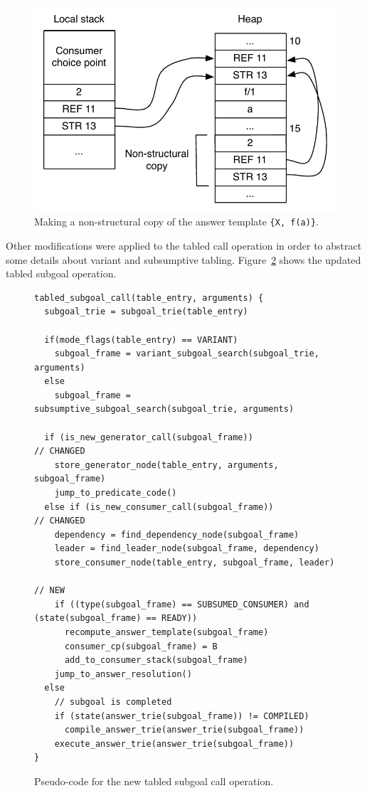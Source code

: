 \begin{figure}[ht]
  \centering
    \includegraphics[scale=0.6]{non_structural_copy.pdf}
  \caption{Making a non-structural copy of the answer template \texttt{\{X,~f(a)\}}.}
  \label{fig:non_structural_copy}
\end{figure}

Other modifications were applied to the tabled call operation in order to abstract some details about
variant and subsumptive tabling. Figure~\ref{fig:tabled_subgoal_call_new} shows the updated tabled
subgoal operation.

\begin{figure}[ht]
\begin{Verbatim}
tabled_subgoal_call(table_entry, arguments) {
  subgoal_trie = subgoal_trie(table_entry)
  
  if(mode_flags(table_entry) == VARIANT)
    subgoal_frame = variant_subgoal_search(subgoal_trie, arguments)
  else
    subgoal_frame = subsumptive_subgoal_search(subgoal_trie, arguments)
  
  if (is_new_generator_call(subgoal_frame))                 // CHANGED
    store_generator_node(table_entry, arguments, subgoal_frame)
    jump_to_predicate_code()
  else if (is_new_consumer_call(subgoal_frame))             // CHANGED
    dependency = find_dependency_node(subgoal_frame)
    leader = find_leader_node(subgoal_frame, dependency)
    store_consumer_node(table_entry, subgoal_frame, leader)
                                                            // NEW
    if ((type(subgoal_frame) == SUBSUMED_CONSUMER) and (state(subgoal_frame) == READY))
      recompute_answer_template(subgoal_frame)
      consumer_cp(subgoal_frame) = B
      add_to_consumer_stack(subgoal_frame)
    jump_to_answer_resolution()
  else
    // subgoal is completed
    if (state(answer_trie(subgoal_frame)) != COMPILED)
      compile_answer_trie(answer_trie(subgoal_frame))
    execute_answer_trie(answer_trie(subgoal_frame))
}
\end{Verbatim}
\caption{Pseudo-code for the new tabled subgoal call operation.}
\label{fig:tabled_subgoal_call_new}
\end{figure}


